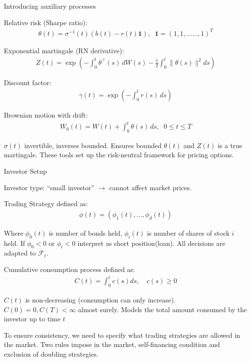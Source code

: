 \documentclass{beamer}
\begin{document}
\begin{frame}{Introducing auxiliary processes}

    {\footnotesize \footnotesize
    \par Relative risk (Sharpe ratio): 
    \begin{align*}
            \theta(t) = \sigma^{-1}(t)\left(b(t) - r(t)\mathbf{1}\right),\;\; \mathbf{1} = (1,1,......,1)^T
    \end{align*}
    \par Exponential martingale (RN derivative): 
    \begin{align*}
        Z(t) = \exp\left(-\int_{0}^{t}\theta^{\top}(s)\,dW(s) - \frac{1}{2}\int_{0}^{t}\|\theta(s)\|^{2}ds\right)
    \end{align*}
    \par  \pause Discount factor:
    \begin{align*}
        \gamma(t) = \exp\left(-\int_{0}^{t}r(s)\,ds\right)
    \end{align*}
    \par Brownian motion with drift:
    \begin{align*}
         W_0(t) = W(t) + \int_{0}^{t}\theta(s)\,ds,\;\; 0\leq t\leq T
    \end{align*}
    \par  \pause $\sigma(t)$ invertible, inverses bounded. Ensures bounded $\theta(t)$ and $Z(t)$ is a true martingale.
    These tools set up the risk-neutral framework for pricing options.

    }   
\end{frame}
\begin{frame}{Investor Setup}

    {\footnotesize \footnotesize
    \par  Investor type: ``small investor'' $\rightarrow$ cannot affect market prices.
    \par Trading Strategy defined as:
    \begin{align*}
         \phi(t) = (\phi_1(t), \ldots, \phi_d(t)) 
    \end{align*}
    \par Where $\phi_0(t)$ is number of bonds held,
     $\phi_i(t)$ is number of shares of stock $i$ held. 
     If  $\phi_0 < 0$ or $\phi_i < 0$ interpret as short position(loan). All decisions are adapted to $\mathcal{F}_t$.
    \par  \pause Cumulative consumption process defined as:
    \begin{align*}
         C(t) = \int_0^t c(s)  ds, \quad c(s) \geq 0
    \end{align*}
    \par $C(t)$ is non-decreasing (consumption can only increase).  $C(0) = 0,  C(T) < \infty$ almost surely. 
    Models the total amount consumed by the investor up to time $t$
    \vspace{1em}
    \par  \pause To ensure consistency, we need to specify what trading strategies are allowed in the market. Two rules impose in the market, 
    self-financing condition and exclusion of doubling strategies.
    }   
\end{frame}
\end{document}
